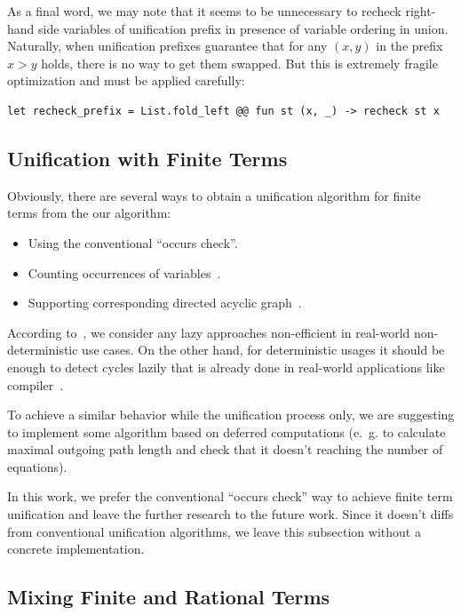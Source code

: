 As a final word, we may note that it seems to be unnecessary to recheck right-hand side variables of unification prefix in presence of variable ordering in union. Naturally, when unification prefixes guarantee that for any $(x, y)$ in the prefix $x > y$ holds, there is no way to get them swapped. But this is extremely fragile optimization and must be applied carefully:
\begin{verbatim}
let recheck_prefix = List.fold_left @@ fun st (x, _) -> recheck st x
\end{verbatim}


\subsection{Unification with Finite Terms}

Obviously, there are several ways to obtain a unification algorithm for finite terms from the our algorithm:
\begin{itemize}
    \item Using the conventional ``occurs check''.
    \item Counting occurrences of variables~\cite{martelli1984efficient}.
    \item Supporting corresponding directed acyclic graph~\cite{pearce2007dynamic}.
\end{itemize}

According to~\cite{domoratskiy2025empirical}, we consider any lazy approaches non-efficient in real-world non-deterministic use cases. On the other hand, for deterministic usages it should be enough to detect cycles lazily that is already done in real-world applications like \OCaml compiler~\cite{kiselyov-ocaml}.

To achieve a similar behavior while the unification process only, we are suggesting to implement some algorithm based on deferred computations (e.~g. to calculate maximal outgoing path length and check that it doesn't reaching the number of equations).

In this work, we prefer the conventional ``occurs check'' way to achieve finite term unification and leave the further research to the future work. Since it doesn't diffs from conventional unification algorithms, we leave this subsection without a concrete implementation.


\subsection{Mixing Finite and Rational Terms}

